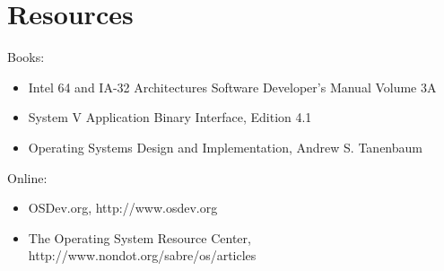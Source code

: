 \documentclass[titlepage]{article}
\begin{document}
\section{Resources}
Books:
\begin{itemize}
    \item Intel 64 and IA-32 Architectures Software Developer's Manual Volume 3A
    \item System V Application Binary Interface, Edition 4.1
    \item Operating Systems Design and Implementation, Andrew S. Tanenbaum
\end{itemize}
Online:
\begin{itemize}
    \item OSDev.org, http://www.osdev.org
    \item The Operating System Resource Center,
          http://www.nondot.org/sabre/os/articles
\end{itemize}
\end{document}
